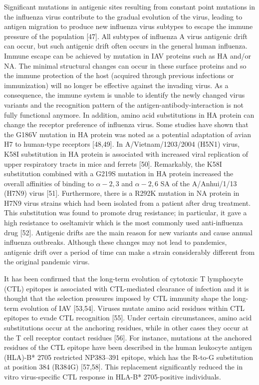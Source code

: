 \documentclass[onecolumn, compsoc,10pt]{IEEEtran}
\begin{document}
{Significant mutations in antigenic sites resulting from constant point mutations in the influenza virus contribute to the gradual evolution of the virus, leading to antigen migration to produce new influenza virus subtypes to escape the immune pressure of the population [47]. All subtypes of influenza A virus antigenic drift can occur, but such antigenic drift often occurs in the general human influenza. Immune escape can be achieved by mutation in IAV proteins such as HA and/or NA. The minimal structural changes can occur in these surface proteins and so the immune protection of the host (acquired through previous infections or immunization) will no longer be effective against the invading virus. As a consequence, the immune system is unable to identify the newly changed virus variants and the recognition pattern of the antigen-antibody-interaction is not fully functional anymore. In addition, amino acid substitutions in HA protein can change the receptor preference of influenza virus. Some studies have shown that the G186V mutation in HA protein was noted as a potential adaptation of avian H7 to human-type receptors [48,49]. In A/Vietnam/1203/2004 (H5N1) virus, K58I substitution in HA protein is associated with increased viral replication of upper respiratory tracts in mice and ferrets [50]. Remarkably, the K58I substitution combined with a G219S mutation in HA protein increased the overall affinities of binding to  $\alpha-2,3$ and  $\alpha-2,6$ SA of the A/Anhui/1/13 (H7N9) virus [51]. Furthermore, there is a R292K mutation in NA protein in H7N9 virus strains which had been isolated from a patient after drug treatment. This substitution was found to promote drug resistance; in particular, it gave a high resistance to oseltamivir which is the most commonly used anti-influenza drug [52]. Antigenic drifts are the main reason for new variants and cause annual influenza outbreaks. Although these changes may not lead to pandemics, antigenic drift over a period of time can make a strain considerably different from the original pandemic virus.

It has been confirmed that the long-term evolution of cytotoxic T lymphocyte (CTL) epitopes is associated with CTL-mediated clearance of infection and it is thought that the selection pressures imposed by CTL immunity shape the long-term evolution of IAV [53,54]. Viruses mutate amino acid residues within CTL epitopes to evade CTL recognition [55]. Under certain circumstances, amino acid substitutions occur at the anchoring residues, while in other cases they occur at the T cell receptor contact residues [56]. For instance, mutations at the anchored residues of the CTL epitope have been described in the human leukocyte antigen (HLA)-B* 2705 restricted NP383–391 epitope, which has the R-to-G substitution at position 384 (R384G) [57,58]. This replacement significantly reduced the in vitro virus-specific CTL response in HLA-B* 2705-positive individuals.

}
\end{document}
